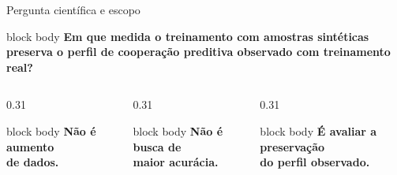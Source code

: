 \begin{frame}{Pergunta científica e escopo}
  \vspace{0.22cm}
  \begin{beamercolorbox}[wd=\linewidth,sep=0.34cm,rounded=true]{block body}
    \centering\bfseries\fontsize{14.6}{18.6}\selectfont\color{CoInfoInk}
    Em que medida o treinamento com amostras sintéticas preserva o perfil de cooperação preditiva observado com treinamento real?
  \end{beamercolorbox}

  \vspace{0.54cm}
  \begin{columns}[onlytextwidth]
    \begin{column}{0.31\textwidth}
      \begin{beamercolorbox}[wd=\linewidth,ht=1.24cm,dp=.20cm,sep=.12cm,rounded=true]{block body}
        \centering\bfseries\fontsize{11.2}{13.6}\selectfont\color{CoInfoRose}
        Não é aumento\\de dados.
      \end{beamercolorbox}
    \end{column}
    \begin{column}{0.31\textwidth}
      \begin{beamercolorbox}[wd=\linewidth,ht=1.24cm,dp=.20cm,sep=.12cm,rounded=true]{block body}
        \centering\bfseries\fontsize{11.2}{13.6}\selectfont\color{CoInfoRose}
        Não é busca de\\maior acurácia.
      \end{beamercolorbox}
    \end{column}
    \begin{column}{0.31\textwidth}
      \begin{beamercolorbox}[wd=\linewidth,ht=1.24cm,dp=.20cm,sep=.12cm,rounded=true]{block body}
        \centering\bfseries\fontsize{11.2}{13.6}\selectfont\color{CoInfoMint}
        É avaliar a preservação\\do perfil observado.
      \end{beamercolorbox}
    \end{column}
  \end{columns}

  \vfill


\end{frame}
